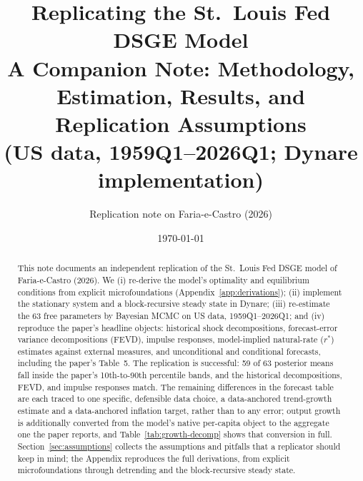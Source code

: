 \documentclass[11pt]{article}
\title{\vspace{-1.0em}Replicating the St.\ Louis Fed DSGE Model\\[0.3em]
\large A Companion Note: Methodology, Estimation, Results, and Replication Assumptions\\[0.2em]
\normalsize (US data, 1959Q1--2026Q1; Dynare implementation)}
\author{Replication note on Faria-e-Castro (2026)}
\date{\today}
\theoremstyle{definition}
\newcommand{\rstar}{r^{*}}
\begin{document}
\maketitle

\begin{abstract}
\noindent This note documents an independent replication of the St.\ Louis Fed DSGE model of
Faria-e-Castro (2026). We (i) re-derive the model's optimality and equilibrium conditions from explicit
microfoundations (Appendix~\ref{app:derivations}); (ii) implement the stationary system and a block-recursive
steady state in Dynare; (iii) re-estimate the 63 free parameters by Bayesian MCMC on US data,
1959Q1--2026Q1; and (iv) reproduce the paper's headline objects: historical shock decompositions,
forecast-error variance decompositions (FEVD), impulse responses, model-implied natural-rate ($\rstar$)
estimates against external measures, and unconditional and conditional forecasts, including the paper's
Table~5. The replication is successful: 59 of 63 posterior means fall inside the paper's 10th-to-90th
percentile bands, and the historical decompositions, FEVD, and impulse responses match. The remaining
differences in the forecast table are each traced to one specific, defensible data choice, a
data-anchored trend-growth estimate and a data-anchored inflation target, rather than to any error;
output growth is additionally converted from the model's native per-capita object to the aggregate one
the paper reports, and Table~\ref{tab:growth-decomp} shows that conversion in full.
Section~\ref{sec:assumptions} collects the assumptions and pitfalls that a replicator should keep in
mind; the Appendix reproduces the full derivations, from explicit microfoundations through detrending
and the block-recursive steady state.
\end{abstract}

\tableofcontents

\end{document}
